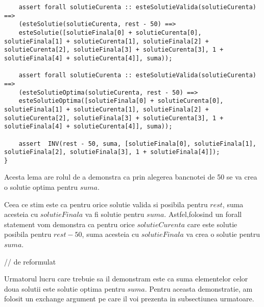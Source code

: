 \begin{enumerate}
\begin{lstlisting}
	assert forall solutieCurenta :: esteSolutieValida(solutieCurenta) ==>
	(esteSolutie(solutieCurenta, rest - 50) ==> 
	esteSolutie([solutieFinala[0] + solutieCurenta[0], solutieFinala[1] + solutieCurenta[1], solutieFinala[2] + solutieCurenta[2], solutieFinala[3] + solutieCurenta[3], 1 + solutieFinala[4] + solutieCurenta[4]], suma));
	
	assert forall solutieCurenta :: esteSolutieValida(solutieCurenta) ==>        
	(esteSolutieOptima(solutieCurenta, rest - 50) ==> 
	esteSolutieOptima([solutieFinala[0] + solutieCurenta[0], solutieFinala[1] + solutieCurenta[1], solutieFinala[2] + solutieCurenta[2], solutieFinala[3] + solutieCurenta[3], 1 + solutieFinala[4] + solutieCurenta[4]], suma));
	
	assert  INV(rest - 50, suma, [solutieFinala[0], solutieFinala[1], solutieFinala[2], solutieFinala[3], 1 + solutieFinala[4]]);
}
\end{lstlisting}
\par 
Acesta lema are rolul de a demonstra ca prin alegerea bancnotei de 50 se va crea o solutie optima pentru $suma$.
\par 
Ceea ce stim este ca pentru orice solutie valida si posibila pentru $rest$, suma acesteia cu $solutieFinala$ va fi solutie pentru $suma$. Astfel,folosind un forall statement vom demonstra ca pentru orice $solutieCurenta$ care este solutie posibila pentru $rest-50$, suma acesteia cu $solutieFinala$ va crea o solutie pentru $suma$. \par 
// de reformulat
\par
Urmatorul lucru care trebuie sa il demonstram este ca suma elementelor celor doua solutii este solutie optima pentru $suma$. Pentru aceasta demonstratie, am folosit un exchange argument pe care il voi prezenta in subsectiunea urmatoare.







\end{enumerate}

